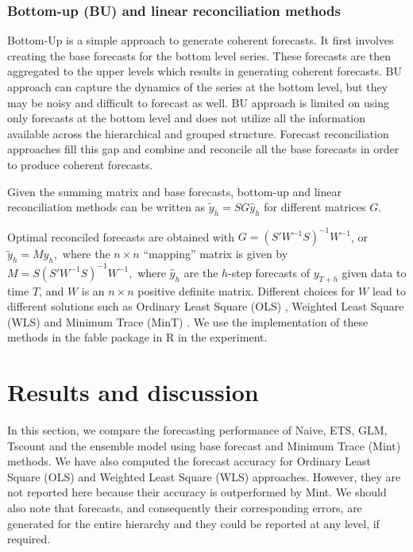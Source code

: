 \documentclass[
  authoryear,
  preprint,
  3p]{elsarticle}
\begin{document}
\hypertarget{bottom-up-bu-and-linear-reconciliation-methods}{%
\subsubsection{Bottom-up (BU) and linear reconciliation
methods}\label{bottom-up-bu-and-linear-reconciliation-methods}}

Bottom-Up is a simple approach to generate coherent forecasts. It first
involves creating the base forecasts for the bottom level series. These
forecasts are then aggregated to the upper levels which results in
generating coherent forecasts. BU approach can capture the dynamics of
the series at the bottom level, but they may be noisy and difficult to
forecast as well. BU approach is limited on using only forecasts at the
bottom level and does not utilize all the information available across
the hierarchical and grouped structure. Forecast reconciliation
approaches fill this gap and combine and reconcile all the base
forecasts in order to produce coherent forecasts.

Given the summing matrix and base forecasts, bottom-up and linear
reconciliation methods can be written as \(\tilde{y}_h = SG\hat{y}_h\)
for different matrices \(G\).

Optimal reconciled forecasts are obtained with
\(G=(S'W^{-1}S)^{-1}W^{-1}\), or \(\tilde{y}_h = M\hat{y}_h,\) where the
\(n\times n\) ``mapping'' matrix is given by
\(M = S(S'W^{-1}S)^{-1}W^{-1},\) where \(\hat{y}_h\) are the \(h\)-step
forecasts of \(y_{T+h}\) given data to time \(T\), and \(W\) is an
\(n \times n\) positive definite matrix. Different choices for \(W\)
lead to different solutions such as Ordinary Least Square (OLS) ,
Weighted Least Square (WLS) and Minimum Trace (MinT)
\citep{WicEtAl2019}. We use the implementation of these methods in the
fable package in R in the experiment.

\hypertarget{sec-result}{%
\section{Results and discussion}\label{sec-result}}

In this section, we compare the forecasting performance of Naive, ETS,
GLM, Tscount and the ensemble model using base forecast and Minimum
Trace (Mint) methods. We have also computed the forecast accuracy for
Ordinary Least Square (OLS) and Weighted Least Square (WLS) approaches.
However, they are not reported here because their accuracy is
outperformed by Mint. We should also note that forecasts, and
consequently their corresponding errors, are generated for the entire
hierarchy and they could be reported at any level, if required.
\end{document}
